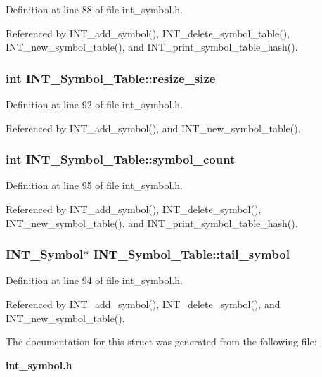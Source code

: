 Definition at line 88 of file int\_\-symbol.h.

Referenced by INT\_\-add\_\-symbol(), INT\_\-delete\_\-symbol\_\-table(), INT\_\-new\_\-symbol\_\-table(), and INT\_\-print\_\-symbol\_\-table\_\-hash().
\subsubsection{\setlength{\rightskip}{0pt plus 5cm}int \bf{INT\_\-Symbol\_\-Table::resize\_\-size}}\label{structINT__Symbol__Table_539d891d02d47d4b99ebe2bcde6200ed}




Definition at line 92 of file int\_\-symbol.h.

Referenced by INT\_\-add\_\-symbol(), and INT\_\-new\_\-symbol\_\-table().
\subsubsection{\setlength{\rightskip}{0pt plus 5cm}int \bf{INT\_\-Symbol\_\-Table::symbol\_\-count}}\label{structINT__Symbol__Table_ae8a9c73da8f522e80fb68f82c363503}




Definition at line 95 of file int\_\-symbol.h.

Referenced by INT\_\-add\_\-symbol(), INT\_\-delete\_\-symbol(), INT\_\-new\_\-symbol\_\-table(), and INT\_\-print\_\-symbol\_\-table\_\-hash().
\subsubsection{\setlength{\rightskip}{0pt plus 5cm}\bf{INT\_\-Symbol}$\ast$ \bf{INT\_\-Symbol\_\-Table::tail\_\-symbol}}\label{structINT__Symbol__Table_56377d3ed2f3ed9a2a3b8fafe0012359}




Definition at line 94 of file int\_\-symbol.h.

Referenced by INT\_\-add\_\-symbol(), INT\_\-delete\_\-symbol(), and INT\_\-new\_\-symbol\_\-table().

The documentation for this struct was generated from the following file:\begin{CompactItemize}
\item 
\bf{int\_\-symbol.h}\end{CompactItemize}

